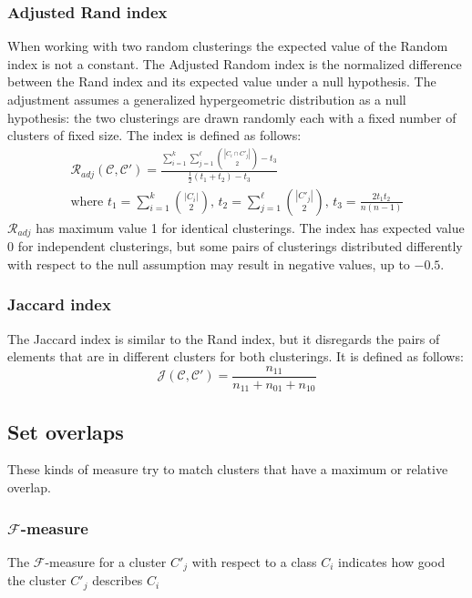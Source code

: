 \subsubsection{Adjusted Rand index}
When working with two random clusterings the expected value of the Random index is not a constant. The Adjusted Random index is the normalized difference between the Rand index and its expected value under a null hypothesis. The adjustment assumes a generalized hypergeometric distribution as a null hypothesis: the two clusterings are drawn randomly each with a fixed number of clusters of fixed size. 
The index is defined as follows:
\begin{equation*}
    \begin{gathered}
       \mathcal{R}_{adj}(\mathcal{C},\mathcal{C}')=\frac{\sum_{i=1}^k\sum_{j=1}^\ell\binom{|C_i\cap C'_j|}{2}-t_3}{\frac{1}{2}(t_1+t_2)-t_3} \\
       \text{where } t_1=\sum_{i=1}^k\binom{|C_i|}{2}\text{, }t_2=\sum_{j=1}^\ell\binom{|C'_j|}{2}\text{, }t_3=\frac{2t_1t_2}{n(n-1)}
    \end{gathered}    
\end{equation*}
$\mathcal{R}_{adj}$ has maximum value 1 for identical clusterings. The index has expected value 0 for independent clusterings, but some pairs of clusterings distributed differently with respect to the null assumption may result in negative values, up to $-0.5$.

\subsubsection{Jaccard index}
The Jaccard index is similar to the Rand index, but it disregards the pairs of elements that are in different clusters for both clusterings. It is defined as follows:
\begin{equation*}
    \mathcal{J}(\mathcal{C},\mathcal{C}')=\frac{n_{11}}{n_{11}+n_{01}+n_{10}}
\end{equation*}

\subsection{Set overlaps}
These kinds of measure try to match clusters that have a maximum or relative overlap.

\subsubsection{$\mathcal{F}$-measure}
The $\mathcal{F}$-measure for a cluster $C'_j$ with respect to a class $C_i$ indicates how good the cluster $C'_j$ describes $C_i$

